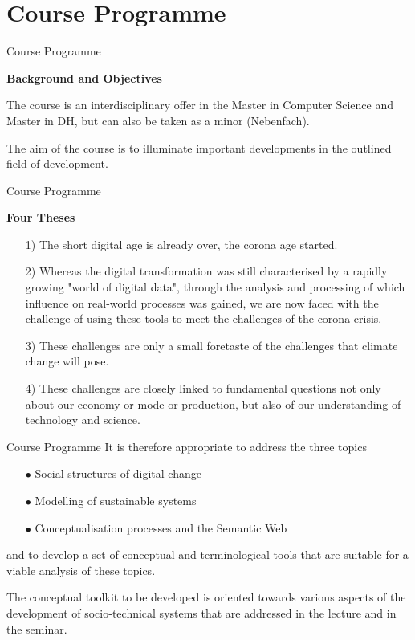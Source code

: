 \documentclass{beamer}
\newcommand{\ueberschrift}[1]{\begin{center}\bf #1\end{center}}
\begin{document}
\section{Course Programme}
\begin{frame}{Course Programme}

\ueberschrift{Background and Objectives}

The course is an interdisciplinary offer in the Master in Computer Science and
Master in DH, but can also be taken as a minor (Nebenfach). 

The aim of the course is to illuminate important developments in the outlined
field of development.  
\end{frame}

\begin{frame}{Course Programme}
\ueberschrift{Four Theses}
\begin{itemize}
\item[1)] The short digital age is already over, the corona age started.
\item[2)] Whereas the digital transformation was still characterised by a
  rapidly growing "world of digital data", through the analysis and processing
  of which influence on real-world processes was gained, we are now faced with
  the challenge of using these tools to meet the challenges of the corona
  crisis.
\item[3)] These challenges are only a small foretaste of the challenges that
  climate change will pose.
\item[4)] These challenges are closely linked to fundamental questions not
  only about our economy or mode or production, but also of our understanding
  of technology and science.
\end{itemize}
\end{frame}

\begin{frame}{Course Programme}
It is therefore appropriate to address the three topics

\begin{itemize}
\item[$\bullet$] Social structures of digital change
\item[$\bullet$] Modelling of sustainable systems
\item[$\bullet$] Conceptualisation processes and the Semantic Web
\end{itemize}
and to develop a set of conceptual and terminological tools that are suitable
for a viable analysis of these topics.

The conceptual toolkit to be developed is oriented towards various aspects of
the development of socio-technical systems that are addressed in the lecture
and in the seminar.
\end{frame}
\end{document}
